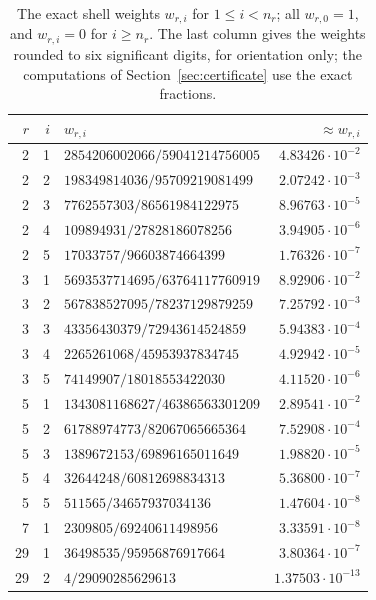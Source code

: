 \begin{table}[htbp]
\centering\small
\caption{The exact shell weights $w_{r,i}$ for $1\le i<n_r$; all
$w_{r,0}=1$, and $w_{r,i}=0$ for $i\ge n_r$. The last column gives the
weights rounded to six significant digits, for orientation only; the
computations of Section~\ref{sec:certificate} use the exact fractions.}
\label{cert:tab-weights}
\begin{tabular}{rrlr}
\toprule
$r$ & $i$ & $w_{r,i}$ & $\approx w_{r,i}$\\
\midrule
2 & 1 & $2854206002066/59041214756005$ & $4.83426\cdot10^{-2}$\\
2 & 2 & $198349814036/95709219081499$ & $2.07242\cdot10^{-3}$\\
2 & 3 & $7762557303/86561984122975$ & $8.96763\cdot10^{-5}$\\
2 & 4 & $109894931/27828186078256$ & $3.94905\cdot10^{-6}$\\
2 & 5 & $17033757/96603874664399$ & $1.76326\cdot10^{-7}$\\
\midrule
3 & 1 & $5693537714695/63764117760919$ & $8.92906\cdot10^{-2}$\\
3 & 2 & $567838527095/78237129879259$ & $7.25792\cdot10^{-3}$\\
3 & 3 & $43356430379/72943614524859$ & $5.94383\cdot10^{-4}$\\
3 & 4 & $2265261068/45953937834745$ & $4.92942\cdot10^{-5}$\\
3 & 5 & $74149907/18018553422030$ & $4.11520\cdot10^{-6}$\\
\midrule
5 & 1 & $1343081168627/46386563301209$ & $2.89541\cdot10^{-2}$\\
5 & 2 & $61788974773/82067065665364$ & $7.52908\cdot10^{-4}$\\
5 & 3 & $1389672153/69896165011649$ & $1.98820\cdot10^{-5}$\\
5 & 4 & $32644248/60812698834313$ & $5.36800\cdot10^{-7}$\\
5 & 5 & $511565/34657937034136$ & $1.47604\cdot10^{-8}$\\
\midrule
7 & 1 & $2309805/69240611498956$ & $3.33591\cdot10^{-8}$\\
\midrule
29 & 1 & $36498535/95956876917664$ & $3.80364\cdot10^{-7}$\\
29 & 2 & $4/29090285629613$ & $1.37503\cdot10^{-13}$\\
\bottomrule
\end{tabular}
\end{table}
